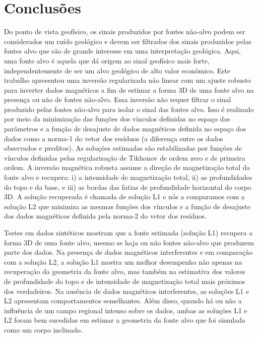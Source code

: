 \chapter{Conclusões}


Do ponto de vista geofísico, os sinais produzidos por fontes não-alvo podem ser considerados um ruído geológico e devem ser filtrados dos sinais produzidos pelas fontes alvo que são de grande interesse em uma interpretação geológica.
Aqui, uma fonte alvo é aquela que dá origem ao sinal geofísico mais forte, independentemente de ser um alvo geológico de alto valor econômico.
Este trabalho apresentou uma inversão regularizada não linear com um ajuste robusto para inverter dados magnéticos a fim de estimar a forma 3D de uma fonte alvo na presença ou não de fontes não-alvo.
Essa inversão não requer filtrar o sinal produzido pelas fontes não-alvo para isolar o sinal das fontes alvo.
Isso é realizado por meio da minimização das funções dos vínculos definidas no espaço dos parâmetros e a função de desajuste de dados magnéticos definida no espaço dos dados como a norma-1 do vetor dos resíduos (a diferença entre os dados observados e preditos).
As soluções estimadas são estabilizadas por funções de vínculos definidas pelas regularização de Tikhonov de ordem zero e de primeira ordem.
A inversão magnética robusta assume a direção de magnetização total da fonte alvo e recupera: i) a intensidade de magnetização total, ii) as profundidades do topo e da base, e iii) as bordas das fatias de profundidade horizontal do corpo 3D.
A solução recuperada é chamada de solução L1 e nós a comparamos com a solução L2 que minimiza as mesmas funções dos vínculos e a função de desajuste dos dados magnéticos definida pela norma-$2$ do vetor dos resíduos.

Testes em dados sintéticos mostram que a fonte estimada (solução L1) recupera a forma 3D de uma fonte alvo, mesmo se haja ou não fontes não-alvo que produzem parte dos dados.
Na presença de dados magnéticos interferentes e em comparação com a solução L2,
a solução L1 mostra um melhor desempenho não apenas na recuperação da geometria da fonte alvo, mas também na estimativa dos valores de profundidade do topo e de intensidade de magnetização total mais próximos dos verdadeiros.
Na ausência de dados magnéticos interferentes, as soluções L1 e L2 apresentam comportamentos semelhantes.
Além disso, quando há ou não a influência de um campo regional intenso sobre os dados, ambas as soluções L1 e L2 foram bem sucedidas em estimar a geometria da fonte alvo que foi simulada como um corpo inclinado.

